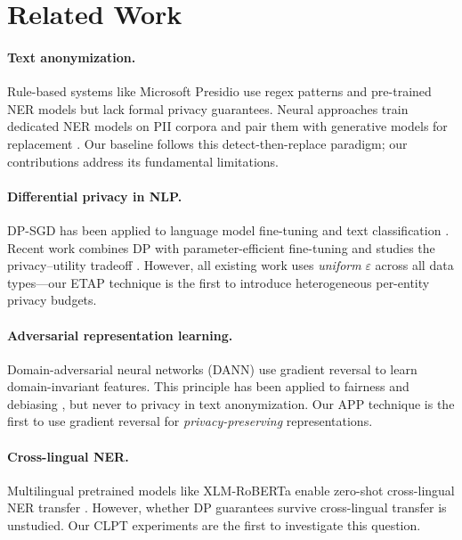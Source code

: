 \documentclass[11pt,a4paper]{article}
\begin{document}
\section{Related Work}
\label{sec:related}

\paragraph{Text anonymization.}
Rule-based systems like Microsoft Presidio \cite{presidio2023} use regex
patterns and pre-trained NER models but lack formal privacy guarantees.
Neural approaches train dedicated NER models on PII corpora
\cite{lison2021anonymization, pilán2022textanonymization} and pair them with
generative models for replacement \cite{yue2023synthetic}.  Our baseline
follows this detect-then-replace paradigm; our contributions address its
fundamental limitations.

\paragraph{Differential privacy in NLP.}
DP-SGD \cite{abadi2016deep} has been applied to language model fine-tuning
\cite{li2022large, yu2022differentially} and text classification
\cite{anil2022large}.  Recent work combines DP with parameter-efficient
fine-tuning \cite{bu2024differentially} and studies the privacy--utility
tradeoff \cite{tramèr2021differentially}.  However, all existing work uses
\emph{uniform} $\varepsilon$ across all data types—our ETAP technique is the
first to introduce heterogeneous per-entity privacy budgets.

\paragraph{Adversarial representation learning.}
Domain-adversarial neural networks (DANN) \cite{ganin2016domain} use gradient
reversal to learn domain-invariant features.  This principle has been applied
to fairness \cite{zhang2018mitigating} and debiasing
\cite{ravfogel2020null}, but never to privacy in text anonymization.  Our
APP technique is the first to use gradient reversal for
\emph{privacy-preserving} representations.

\paragraph{Cross-lingual NER.}
Multilingual pretrained models like XLM-RoBERTa \cite{conneau2020unsupervised}
enable zero-shot cross-lingual NER transfer
\cite{pires2019multilingual, wu2020explicit}.  However, whether DP guarantees
survive cross-lingual transfer is unstudied.  Our CLPT experiments are the
first to investigate this question.
\end{document}
